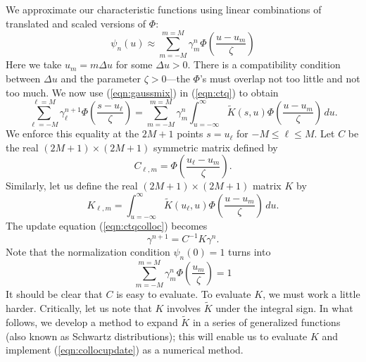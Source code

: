 \documentclass[12pt]{l4dc2021}
\begin{document}
We approximate our characteristic functions using linear combinations of translated and scaled versions of $\Phi$:
\begin{equation}
\label{eqn:gaussmix}
\psi_n(u) \approx \sum_{m=-M}^{m=M} \gamma^n_m \Phi\left( \frac{u-u_m}{\zeta}  \right)
\end{equation}
Here we take $u_m = m \Delta u$ for some $\Delta u > 0$.  There is a compatibility condition between $\Delta u$ and the parameter $\zeta > 0$---the $\Phi$'s must overlap not too little and not too much.
We now use (\ref{eqn:gaussmix}) in (\ref{eqn:ctq}) to obtain
\begin{equation}
\label{eqn:ctqcolloc}
\sum_{\ell=-M}^{\ell=M} \gamma^{n+1}_{\ell} \Phi \left( \frac{s - u_{\ell}}{\zeta} \right) = \sum_{m=-M}^{m=M}  \gamma^n_m  \int_{u=-\infty}^{\infty} \widetilde{K}(s,u) \Phi \left( \frac{u - u_m}{\zeta} \right) \, du.
\end{equation}
We enforce this equality at the $2M+1$ points $s = u_{\ell}$ for $-M \leq \ell \leq M$.  Let $C$ be the real $(2M+1) \times (2M+1)$ symmetric matrix defined by
\[
C_{\ell, m} = \Phi \left( \frac{u_{\ell} - u_{m}}{\zeta} \right).
\]
Similarly, let us define the real $(2M+1) \times (2M+1)$ matrix $K$ by
\begin{equation}
\label{eqn:Kmatdef}
K_{\ell, m} = \int_{u=-\infty}^{\infty} \widetilde{K}(u_{\ell},u) \Phi \left( \frac{u - u_m}{\zeta} \right) \, du.
\end{equation}
The update equation (\ref{eqn:ctqcolloc}) becomes
\begin{equation}
\label{eqn:collocupdate}
\gamma^{n+1} = C^{-1} K \gamma^n.
\end{equation}
Note that the normalization condition $\psi_n(0) = 1$ turns into
\begin{equation}
\label{eqn:collocnorm}
\sum_{m=-M}^{m=M} \gamma^n_m \Phi \left( \frac{u_m}{\zeta} \right) = 1
\end{equation}
It should be clear that $C$ is easy to evaluate.  To evaluate $K$, we must work a little harder.  Critically, let us note that $K$ involves $\widetilde{K}$ under the integral sign.  In what follows, we develop a method to expand $\widetilde{K}$ in a series of generalized functions (also known as Schwartz distributions); this will enable us to evaluate $K$ and implement (\ref{eqn:collocupdate}) as a numerical method.
\end{document}
